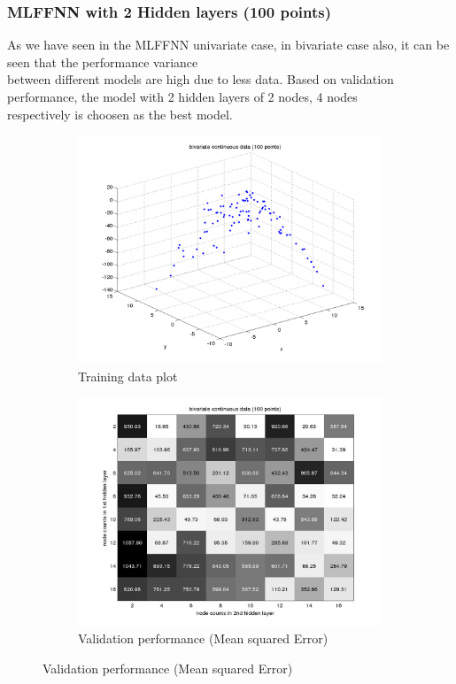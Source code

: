 \documentclass[fleqn]{article}
\begin{document}
\subsubsection{MLFFNN with 2 Hidden layers (100 points)}

As we have seen in the MLFFNN univariate case, in bivariate case also, it can be seen that the performance variance \\
between different models are high due to less data. Based on validation performance, the model with 2 hidden layers of 2 nodes, 4 nodes\\
respectively is choosen as the best model.

\begin{figure}[!ht]
\begin{subfigure}{.5\textwidth}
  \caption{Training data plot}
\includegraphics[scale=0.5]{pics/bivariate100/dataPlot}
\end{subfigure}
\begin{subfigure}{.5\textwidth}
\caption{Validation performance (Mean squared Error)}
\includegraphics[scale=0.2]{pics/bivariate100/bivariate continuous data (100 points)_validationerror}
\end{subfigure}
\end{figure}
\end{document}
